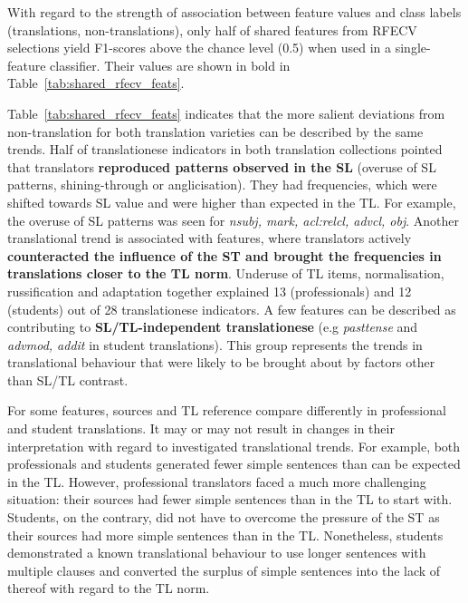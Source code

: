 With regard to the strength of association between feature values and class labels (translations, non-translations), only half of shared features from RFECV selections yield F1-scores above the chance level (0.5) when used in a single-feature classifier. Their values are shown in bold in Table~\ref{tab:shared_rfecv_feats}.

Table~\ref{tab:shared_rfecv_feats} indicates that the more salient deviations from non-translation for both translation varieties can be described by the same trends. Half of translationese indicators in both translation collections pointed that translators \textbf{reproduced patterns observed in the SL} (overuse of SL patterns, shining-through or anglicisation). They had frequencies, which were shifted towards SL value and were higher than expected in the TL. For example, the overuse of SL patterns was seen for \textit{nsubj, mark, acl:relcl, advcl, obj}. Another translational trend is associated with features, where translators actively \textbf{counteracted the influence of the ST and brought the frequencies in translations closer to the TL norm}. Underuse of TL items, normalisation, russification and adaptation together explained 13 (professionals) and 12 (students) out of 28 translationese indicators. A few features can be described as contributing to \textbf{SL/TL-independent translationese} (e.g \textit{pasttense} and \textit{advmod, addit} in student translations). This group represents the trends in translational behaviour that were likely to be brought about by factors other than SL/TL contrast. 

For some features, sources and TL reference compare differently in professional and student translations. It may or may not result in changes in their interpretation with regard to investigated translational trends. 
For example, both professionals and students generated fewer simple sentences than can be expected in the TL. However, professional translators faced a much more challenging situation: their sources had fewer simple sentences than in the TL to start with. Students, on the contrary, did not have to overcome the pressure of the ST as their sources had more simple sentences than in the TL. Nonetheless, students demonstrated a known translational behaviour to use longer sentences with multiple clauses and converted the surplus of simple sentences into the lack of thereof with regard to the TL norm. 

